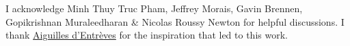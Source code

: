I acknowledge Minh Thuy Truc Pham, Jeffrey Morais, Gavin Brennen, Gopikrishnan Muraleedharan \& Nicolas Roussy Newton for helpful discussions. I thank \href{https://youtube.com/playlist?list=PLeRYUHyTyGxaeZpLq_YxA2D4Ydiq7QfHg}{Aiguilles d'Entr{\`e}ves} for the inspiration that led to this work.
